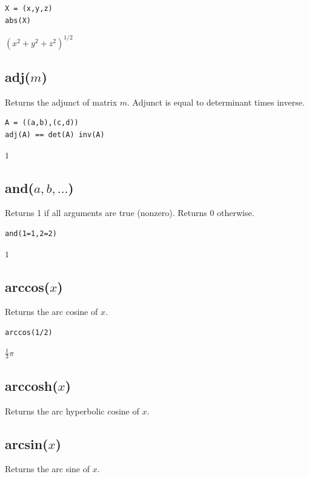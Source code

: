 \documentclass[12pt]{article}
\begin{document}
{\color{blue}
\begin{verbatim}
X = (x,y,z)
abs(X)
\end{verbatim}
}

\noindent
$\left(x^2+y^2+z^2\right)^{1/2}$

\subsection*{adj($m$)}

Returns the adjunct of matrix $m$.
Adjunct is equal to determinant times inverse.

{\color{blue}
\begin{verbatim}
A = ((a,b),(c,d))
adj(A) == det(A) inv(A)
\end{verbatim}
}

\noindent
$1$

\subsection*{and($a,b,\ldots$)}

Returns 1 if all arguments are true (nonzero).
Returns 0 otherwise.

{\color{blue}
\begin{verbatim}
and(1=1,2=2)
\end{verbatim}
}

\noindent
$1$

\subsection*{arccos($x$)}

Returns the arc cosine of $x$.

{\color{blue}
\begin{verbatim}
arccos(1/2)
\end{verbatim}
}

\noindent
$\tfrac{1}{3}\pi$

\subsection*{arccosh($x$)}

Returns the arc hyperbolic cosine of $x$.

\subsection*{arcsin($x$)}

Returns the arc sine of $x$.
\end{document}
